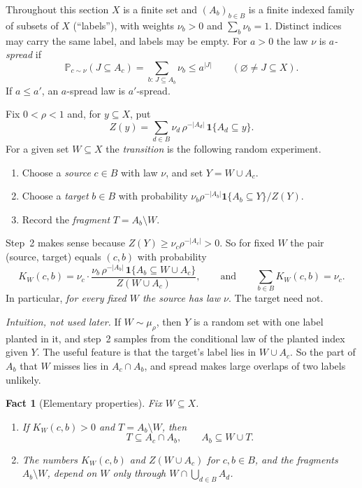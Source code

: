 \documentclass[11pt]{article}
\newtheorem{fact}{Fact}
\numberwithin{equation}{section}
\newcommand{\PP}{\mathbb P}
\newcommand{\ind}{\mathbf 1}
\begin{document}
Throughout this section $X$ is a finite set and $(A_b)_{b\in B}$ is a
finite indexed family of subsets of $X$ (``labels''), with weights
$\nu_b>0$ and $\sum_{b}\nu_b=1$. Distinct indices may carry the same
label, and labels may be empty. For $a>0$ the law $\nu$ is
\emph{$a$-spread} if
\begin{equation}\label{eq:spread}
 \PP_{c\sim\nu}(J\subseteq A_c)=\sum_{b:\,J\subseteq A_b}\nu_b\le a^{|J|}
 \qquad(\varnothing\ne J\subseteq X).
\end{equation}
If $a\le a'$, an $a$-spread law is $a'$-spread.

Fix $0<\rho<1$ and, for $y\subseteq X$, put
\begin{equation}\label{eq:Z}
 Z(y)=\sum_{d\in B}\nu_d\,\rho^{-|A_d|}\,\ind\{A_d\subseteq y\}.
\end{equation}
For a given set $W\subseteq X$ the \emph{transition} is the following
random experiment.
\begin{enumerate}[label=\arabic*.,leftmargin=2em,itemsep=2pt]
 \item Choose a \emph{source} $c\in B$ with law $\nu$, and set
 $Y=W\cup A_c$.
 \item Choose a \emph{target} $b\in B$ with probability
 $\nu_b\rho^{-|A_b|}\ind\{A_b\subseteq Y\}/Z(Y)$.
 \item Record the \emph{fragment} $T=A_b\setminus W$.
\end{enumerate}
Step~2 makes sense because $Z(Y)\ge\nu_c\rho^{-|A_c|}>0$. So for fixed
$W$ the pair (source, target) equals $(c,b)$ with probability
\begin{equation}\label{eq:kernel}
 K_W(c,b)=\nu_c\cdot
 \frac{\nu_b\,\rho^{-|A_b|}\,\ind\{A_b\subseteq W\cup A_c\}}{Z(W\cup A_c)},
 \qquad\text{and}\qquad \sum_{b\in B}K_W(c,b)=\nu_c .
\end{equation}
In particular, \emph{for every fixed $W$ the source has law $\nu$}. The
target need not.

\emph{Intuition, not used later.} If $W\sim\mu_\rho$, then $Y$ is a
random set with one label planted in it, and step~2 samples from the
conditional law of the planted index given $Y$. The useful feature is
that the target's label lies in $W\cup A_c$. So the part of $A_b$ that
$W$ misses lies in $A_c\cap A_b$, and spread makes large overlaps of
two labels unlikely.

\begin{fact}[Elementary properties]\label{fact:A}
Fix $W\subseteq X$.
\begin{enumerate}[label=(\alph*),leftmargin=2.2em,itemsep=2pt]
 \item If $K_W(c,b)>0$ and $T=A_b\setminus W$, then
 \begin{equation}\label{eq:two-inclusions}
  T\subseteq A_c\cap A_b,\qquad A_b\subseteq W\cup T .
 \end{equation}
 \item The numbers $K_W(c,b)$ and $Z(W\cup A_c)$ for $c,b\in B$, and
 the fragments $A_b\setminus W$, depend on $W$ only through
 $W\cap\bigcup_{d\in B}A_d$.
\end{enumerate}
\end{fact}
\end{document}
